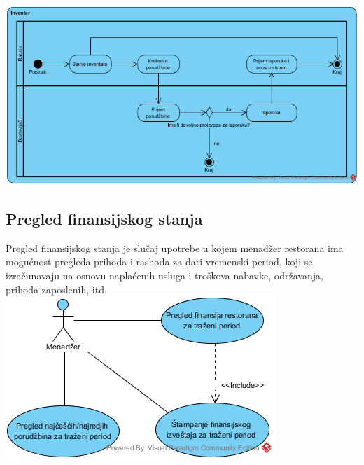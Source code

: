\documentclass{article}
\begin{document}
\includegraphics[width=\textwidth]{SU_2_pregled_inventara_activity.png}


\subsection{Pregled finansijskog stanja}
Pregled finansijskog stanja je slučaj upotrebe u kojem menadžer restorana ima mogućnost pregleda prihoda i rashoda za dati vremenski period, koji se izračunavaju na osnovu naplaćenih usluga i troškova nabavke, održavanja, prihoda zaposlenih, itd.
\\
\includegraphics[width=\linewidth]{SU_3_pregled_finansija.png}
\end{document}
